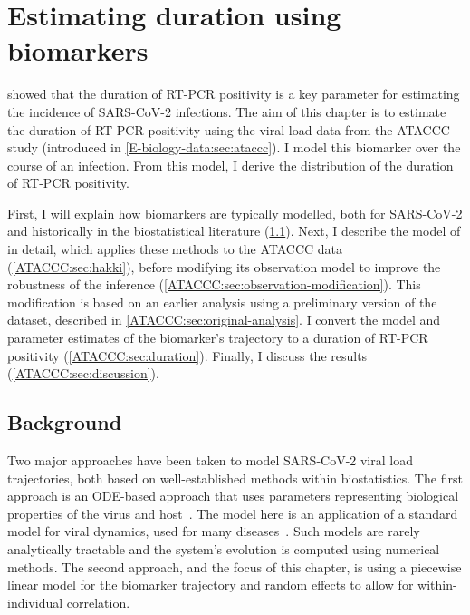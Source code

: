 \documentclass[thesis.tex]{subfiles}
\begin{document}
\ifSubfilesClassLoaded{
  \setcounter{chapter}{3}
}

\chapter{Estimating duration using biomarkers} \label{ATACCC}

 showed that the duration of RT-PCR positivity is a key parameter for estimating the incidence of SARS-CoV-2 infections.
The aim of this chapter is to estimate the duration of RT-PCR positivity using the viral load data from the ATACCC study (introduced in \cref{E-biology-data:sec:ataccc}).
I model this biomarker over the course of an infection.
From this model, I derive the distribution of the duration of RT-PCR positivity.

First, I will explain how biomarkers are typically modelled, both for SARS-CoV-2 and historically in the biostatistical literature (\cref{ATACCC:sec:background}).
Next, I describe the model of \textcite{hakkiOnset} in detail, which applies these methods to the ATACCC data (\cref{ATACCC:sec:hakki}), before modifying its observation model to improve the robustness of the inference (\cref{ATACCC:sec:observation-modification}).
This modification is based on an earlier analysis using a preliminary version of the dataset, described in \cref{ATACCC:sec:original-analysis}.
I convert the model and parameter estimates of the biomarker's trajectory to a duration of RT-PCR positivity (\cref{ATACCC:sec:duration}).
Finally, I discuss the results (\cref{ATACCC:sec:discussion}).

\section{Background} \label{ATACCC:sec:background}

Two major approaches have been taken to model SARS-CoV-2 viral load trajectories, both based on well-established methods within biostatistics.
The first approach is an ODE-based approach that uses parameters representing biological properties of the virus and host~\autocite[e.g.][]{ejimaEstimation,keVivo,kimQuantitative,goncalvesTiming,perelsonMechanistic}.
The model here is an application of a standard model for viral dynamics, used for many diseases~\autocite{perelsonMechanistic,hernandez-vargasInhost}.
Such models are rarely analytically tractable and the system's evolution is computed using numerical methods.
The second approach, and the focus of this chapter, is using a piecewise linear model for the biomarker trajectory and random effects to allow for within-individual correlation.
\end{document}
